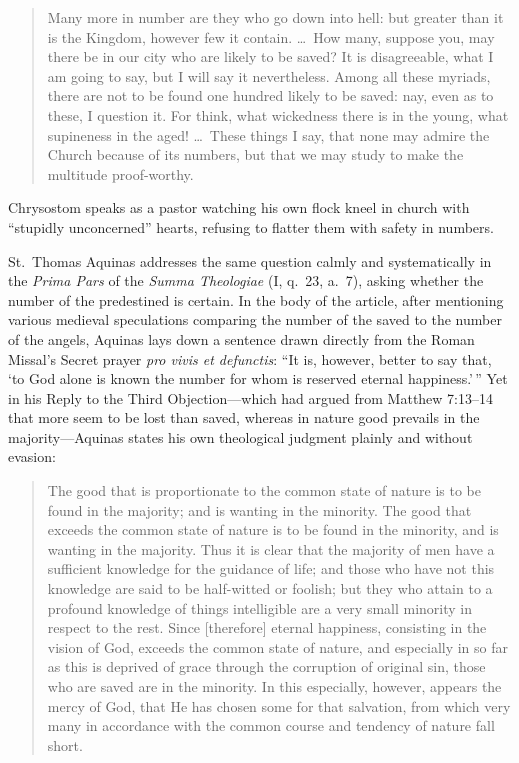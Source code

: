 \begin{quote}
Many more in number are they who go down into hell: but greater than it is the Kingdom, however few it contain. \dots\ How many, suppose you, may there be in our city who are likely to be saved? It is disagreeable, what I am going to say, but I will say it nevertheless. Among all these myriads, there are not to be found one hundred likely to be saved: nay, even as to these, I question it. For think, what wickedness there is in the young, what supineness in the aged! \dots\ These things I say, that none may admire the Church because of its numbers, but that we may study to make the multitude proof-worthy.
\end{quote}

Chrysostom speaks as a pastor watching his own flock kneel in church with ``stupidly unconcerned'' hearts, refusing to flatter them with safety in numbers.

St.\ Thomas Aquinas addresses the same question calmly and systematically in the \textit{Prima Pars} of the \textit{Summa Theologiae} (I, q.\ 23, a.\ 7), asking whether the number of the predestined is certain. In the body of the article, after mentioning various medieval speculations comparing the number of the saved to the number of the angels, Aquinas lays down a sentence drawn directly from the Roman Missal's Secret prayer \textit{pro vivis et defunctis}: ``It is, however, better to say that, `to God alone is known the number for whom is reserved eternal happiness.'\,'' Yet in his Reply to the Third Objection---which had argued from Matthew 7:13--14 that more seem to be lost than saved, whereas in nature good prevails in the majority---Aquinas states his own theological judgment plainly and without evasion:

\begin{quote}
The good that is proportionate to the common state of nature is to be found in the majority; and is wanting in the minority. The good that exceeds the common state of nature is to be found in the minority, and is wanting in the majority. Thus it is clear that the majority of men have a sufficient knowledge for the guidance of life; and those who have not this knowledge are said to be half-witted or foolish; but they who attain to a profound knowledge of things intelligible are a very small minority in respect to the rest. Since [therefore] eternal happiness, consisting in the vision of God, exceeds the common state of nature, and especially in so far as this is deprived of grace through the corruption of original sin, those who are saved are in the minority. In this especially, however, appears the mercy of God, that He has chosen some for that salvation, from which very many in accordance with the common course and tendency of nature fall short.
\end{quote}

